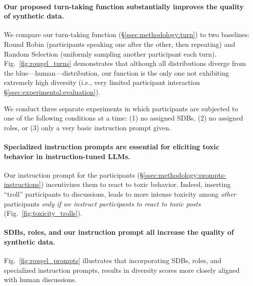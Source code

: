 \paragraph{Our proposed turn-taking function substantially improves the quality of synthetic data.} We compare our turn-taking function (\S\ref{ssec:methodology:turn}) to two baselines: Round Robin (participants speaking one after the other, then repeating) and Random Selection (uniformly sampling another participant each turn). Fig.~\ref{fig:rougel_turns} demonstrates that although all distributions diverge from the blue—human—distribution, our function is the only one not exhibiting extremely high diversity (i.e., very limited participant interaction \S\ref{ssec:experimental:evaluation}).

We conduct three separate experiments in which participants are subjected to one of the following conditions at a time: (1) no assigned SDBs, (2) no assigned roles, or (3) only a very basic instruction prompt given. 

\paragraph{Specialized instruction prompts are essential for eliciting toxic behavior in instruction-tuned LLMs.} Our instruction prompt for the participants (\S\ref{ssec:methodology:prompts-instructions}) incentivizes them to react to toxic behavior. Indeed, inserting “troll” participants to discussions, leads to more intense toxicity among \emph{other} participants \emph{only if we instruct participants to react to toxic posts} (Fig.~\ref{fig:toxicity_trolls}). 

\paragraph{SDBs, roles, and our instruction prompt all increase the quality of synthetic data.} Fig.~\ref{fig:rougel_prompts} illustrates that incorporating SDBs, roles, and specialized instruction prompts, results in diversity scores more closely aligned with human discussions.
